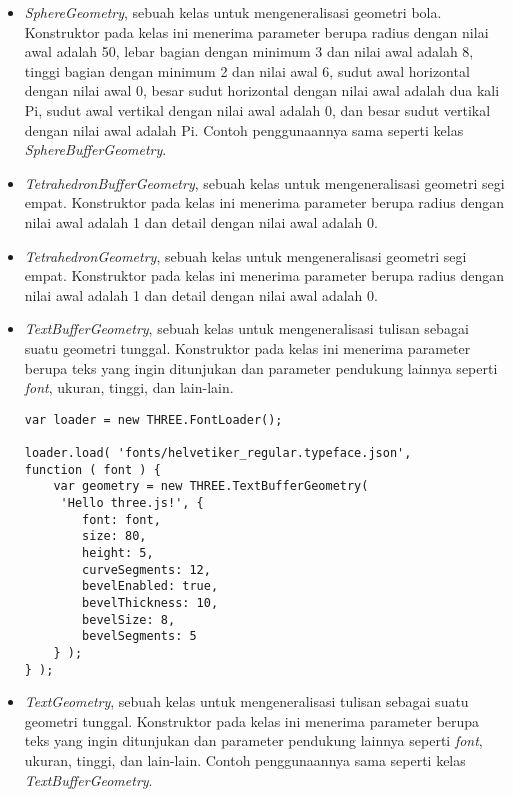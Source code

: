 \begin{itemize}
\begin{itemize}
	\item {\it SphereGeometry}, sebuah kelas untuk mengeneralisasi geometri bola. Konstruktor pada kelas ini menerima parameter berupa radius dengan nilai awal adalah 50, lebar bagian dengan minimum 3 dan nilai awal adalah 8, tinggi bagian dengan minimum 2 dan nilai awal 6, sudut awal horizontal dengan nilai awal 0, besar sudut horizontal dengan nilai awal adalah dua kali Pi, sudut awal vertikal dengan nilai awal adalah 0, dan besar sudut vertikal dengan nilai awal adalah Pi. Contoh penggunaannya sama seperti kelas {\it SphereBufferGeometry}.
	
	\item {\it TetrahedronBufferGeometry}, sebuah kelas untuk mengeneralisasi geometri segi empat. Konstruktor pada kelas ini menerima parameter berupa radius dengan nilai awal adalah 1 dan detail dengan nilai awal adalah 0.
	
	\item {\it TetrahedronGeometry}, sebuah kelas untuk mengeneralisasi geometri segi empat. Konstruktor pada kelas ini menerima parameter berupa radius dengan nilai awal adalah 1 dan detail dengan nilai awal adalah 0.
	
	\item {\it TextBufferGeometry}, sebuah kelas untuk mengeneralisasi tulisan sebagai suatu geometri tunggal. Konstruktor pada kelas ini menerima parameter berupa teks yang ingin ditunjukan dan parameter pendukung lainnya seperti {\it font}, ukuran, tinggi, dan lain-lain.
	
\begin{lstlisting}[caption={Contoh penggunaan kelas {\it TextBufferGeometry}.},captionpos=b]
var loader = new THREE.FontLoader();

loader.load( 'fonts/helvetiker_regular.typeface.json',
function ( font ) {
	var geometry = new THREE.TextBufferGeometry(
	 'Hello three.js!', {
		font: font,
		size: 80,
		height: 5,
		curveSegments: 12,
		bevelEnabled: true,
		bevelThickness: 10,
		bevelSize: 8,
		bevelSegments: 5
	} );
} );
\end{lstlisting}

	\item {\it TextGeometry},  sebuah kelas untuk mengeneralisasi tulisan sebagai suatu geometri tunggal. Konstruktor pada kelas ini menerima parameter berupa teks yang ingin ditunjukan dan parameter pendukung lainnya seperti {\it font}, ukuran, tinggi, dan lain-lain. Contoh penggunaannya sama seperti kelas {\it TextBufferGeometry}.
	

\end{itemize}
\end{itemize}
